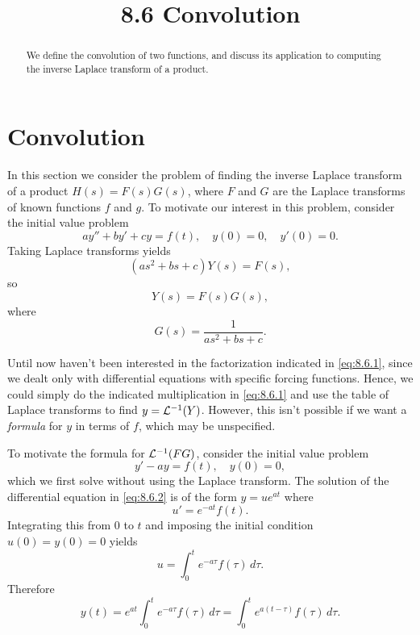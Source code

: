 \documentclass{ximera}
\title{8.6 Convolution}%
\begin{document}
\begin{abstract}
We define the convolution of two functions, and discuss its application to computing the inverse Laplace transform of a product.
\end{abstract}

\maketitle

\section*{Convolution}

In this section we consider the problem of finding the inverse Laplace
transform of a product $H(s)=F(s)G(s)$, where $F$ and $G$ are the
Laplace transforms of known functions $f$ and $g$. To motivate our
interest in this problem, consider the initial value problem
$$
ay''+by'+cy=f(t),\quad y(0)=0,\quad y'(0)=0.
$$
Taking Laplace transforms  yields
$$
(as^2+bs+c)Y(s)=F(s),
$$
so
\begin{equation}\label{eq:8.6.1}
Y(s)=F(s)G(s),
\end{equation}
where
$$
G(s)=\frac{1}{as^2+bs+c}.
$$

Until now haven't been interested in the factorization indicated
in \eqref{eq:8.6.1}, since we dealt only with differential equations
with specific forcing functions. Hence, we could simply do the
indicated multiplication in \eqref{eq:8.6.1} and use the table of Laplace
transforms to find $y={\cal L}^{-1}(Y)$. However, this isn't  possible
if we want a \textit{formula} for $y$ in terms of $f$, which may be
unspecified.

To motivate the formula for ${\cal L}^{-1}(FG)$, consider the initial
value problem
\begin{equation}\label{eq:8.6.2}
y'-ay=f(t),\quad  y(0)=0,
\end{equation}
which we first solve without using the Laplace transform.
The solution of  the differential equation in \eqref{eq:8.6.2}
is of the form $y=ue^{at}$ where
$$
u'=e^{-at}f(t).
$$
Integrating this from $0$ to $t$ and imposing the initial condition
$u(0)=y(0)=0$ yields
$$
u=\int_0^t e^{-a\tau}f(\tau)\,d\tau.
$$
Therefore
\begin{equation}\label{eq:8.6.3}
y(t)=e^{at}\int_0^t e^{-a\tau}f(\tau)\,d\tau=\int_0^t
e^{a(t-\tau)}f(\tau)\,d\tau.
\end{equation}
\end{document}
